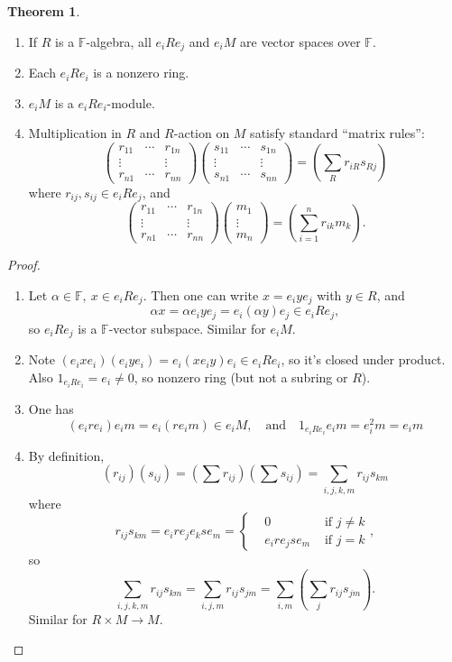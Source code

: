 \documentclass[a4paper]{article}
\newcommand{\F}{\mathbb{F}}
\theoremstyle{definition}
\newtheorem{thm}[defn]{Theorem}
\begin{document}
\begin{thm}
\begin{enumerate}
\item If $R$ is a $\F$-algebra, all $e_iRe_j$ and $e_iM$ are vector spaces over $\F$.
\item Each $e_iRe_i$ is a nonzero ring.
\item $e_iM$ is a $e_iRe_i$-module.
\item Multiplication in $R$ and $R$-action on $M$ satisfy standard ``matrix rules'':
\[
\begin{pmatrix}
r_{11} & \cdots & r_{1n} \\
\vdots & & \vdots \\
r_{n1} & \cdots & r_{nn}
\end{pmatrix}\begin{pmatrix}
s_{11} & \cdots & s_{1n} \\
\vdots & & \vdots \\
s_{n1} & \cdots & s_{nn}
\end{pmatrix}=\left(\sum_R r_{iR}s_{Rj}\right)
\]
where $r_{ij},s_{ij}\in e_iRe_j$, and
\[
\begin{pmatrix}
r_{11} & \cdots & r_{1n} \\
\vdots & & \vdots \\
r_{n1} & \cdots & r_{nn}
\end{pmatrix}\begin{pmatrix}
m_1\\ \vdots \\ m_n
\end{pmatrix}=\left(\sum_{i=1}^n r_{ik}m_k\right).
\]
\end{enumerate}
\end{thm}
\begin{proof}
\begin{enumerate}
\item Let $\alpha\in\F,\ x\in e_iRe_j$. Then one can write $x=e_iye_j$ with $y\in R$, and
\[
\alpha x=\alpha e_i y e_j=e_i(\alpha y)e_j\in e_iRe_j,
\]
so $e_iRe_j$ is a $\F$-vector subspace. Similar for $e_iM$.
\item Note $(e_ixe_i)(e_iye_i)=e_i(xe_iy)e_i\in e_iRe_i$, so it's closed under product. Also $1_{e_iRe_i}=e_i\neq 0$, so nonzero ring (but not a subring or $R$).
\item One has\[
(e_ire_i)e_im=e_i(re_im)\in e_iM,\quad \text{and}\quad 1_{e_iRe_i}e_im=e_i^2m=e_im
\]
\item By definition,
\[
(r_{ij})(s_{ij})=\left(\sum r_{ij}\right)\left(\sum s_{ij}\right)=\sum_{i,j,k,m}r_{ij}s_{km}
\]
where
\[
r_{ij}s_{km}=e_ire_je_kse_m=\left\{\begin{aligned}
  &0 &\text{ if }j\neq k\\
  &e_ire_jse_m &\text{ if }j=k
\end{aligned}  \right.,
\]
so
\[
\sum_{i,j,k,m}r_{ij}s_{km}=\sum_{i,j,m}r_{ij}s_{jm}=\sum_{i,m}\left(\sum_j r_{ij}s_{jm}\right).
\]
Similar for $R\times M\rightarrow M$.
\end{enumerate}
\end{proof}
\end{document}
